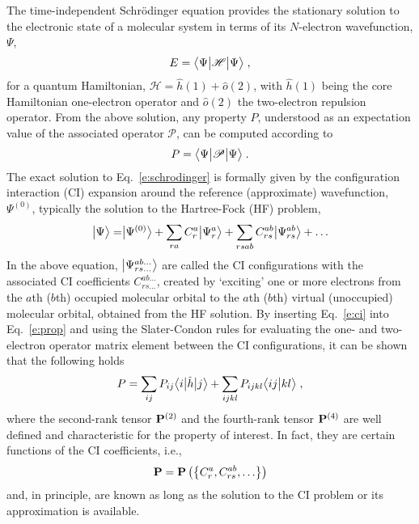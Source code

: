 The time\hyp{}independent Schr{\"o}dinger equation provides the stationary solution to the
electronic state
of a molecular system in terms of its $N$\hyp{}electron wavefunction, $\Psi$,
%
\begin{equation} \label{e:schrodinger}
 E = \tBraKet{\Psi}{\mathscr{H}}{\Psi} \;,
\end{equation}
%
for a quantum Hamiltonian, $\mathscr{H} = \hat{h}(1) + \hat{o}(2)$,
with $\hat{h}(1)$ being the core Hamiltonian one\hyp{}electron operator
and $\hat{o}(2)$ the two\hyp{}electron repulsion operator.
From the above solution, any property $P$, understood as an expectation value of the
associated operator $\mathscr{P}$, can be computed according to
%
\begin{equation} \label{e:prop}
 P = \tBraKet{\Psi}{\mathscr{P}}{\Psi} \;.
\end{equation}
%
The exact solution to Eq.~\eqref{e:schrodinger} is formally given by
the configuration interaction (CI) expansion around the reference 
(approximate) wavefunction, $\Psi^{(0)}$,
typically the solution to the Hartree\hyp{}Fock (HF) problem\cite{Roothaan.RevModPhys.1951},
%
\begin{equation} \label{e:ci}
 \Ket{\Psi} = \Ket{\Psi^{(0)}} + \sum_{ra} C_{r}^{a} \Ket{\Psi_{r}^{a}} + 
	 \sum_{rsab} C_{rs}^{ab} \Ket{\Psi_{rs}^{ab}} + \ldots
\end{equation}
%
In the above equation,
$\Ket{\Psi_{rs\ldots}^{ab\ldots}}$ are called the CI configurations
with the associated CI coefficients $C_{rs\ldots}^{ab\ldots}$, created by `exciting'
one or more electrons from the $a$th ($b$th) occupied molecular orbital to the $a$th ($b$th)
virtual (unoccupied) molecular orbital, obtained from the HF solution.
By inserting Eq.~\eqref{e:ci} into Eq.~\eqref{e:prop} 
and using the Slater\hyp{}Condon rules for evaluating the one\hyp{} and two\hyp{}electron
operator matrix element between
the CI configurations, it can be shown that the following holds
%
\begin{equation} \label{e:exp-val-series}
	P =
	\sum_{ij} P_{ij} \tBraKet{i}{\hat{h}}{j}
	+ \sum_{ijkl} P_{ijkl} \BraKet{ij}{kl}  \;,
\end{equation}
%
where the second\hyp{}rank tensor ${\bf P}^{(2)}$ 
and the fourth\hyp{}rank tensor ${\bf P}^{(4)}$ 
are well defined and characteristic for the property of interest.
In fact, they are certain functions of the CI coefficients, i.e.,
%
\begin{equation}
{\bf P} = {\bf P}
\left(
 \left\{
  C_{r}^{a}, C_{rs}^{ab}, \ldots 
 \right\} 
\right)
\end{equation}
%
and, in principle, are known as long as the solution to the CI problem 
or its approximation is available.

